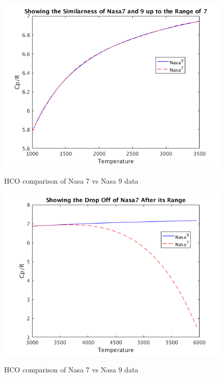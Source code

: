 \documentclass{article}
\begin{document}
\begin{figure}
  \centering
  \includegraphics[width=\textwidth]{Cp2.png}
  \label{fig:cp2}
  \caption{HCO comparison of Nasa 7 vs Nasa 9 data}
\end{figure}


\begin{figure}
  \centering
  \includegraphics[width=\textwidth]{Cp3.png}
  \label{fig:cp3}
  \caption{HCO comparison of Nasa 7 vs Nasa 9 data}
\end{figure}
\end{document}
